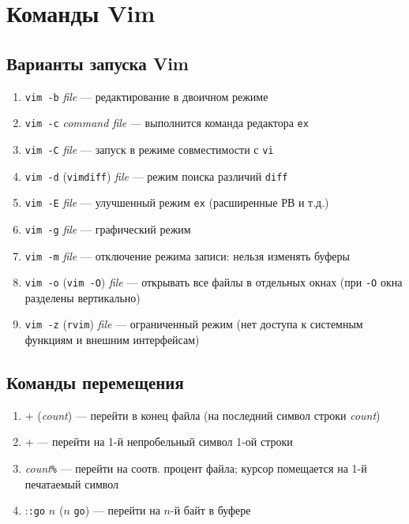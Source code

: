 \documentclass[a4paper,10pt, twocolumn]{article}
\newcommand*{\cod}[1]{\texttt{#1}}
\begin{document}
\newpage
\section{Команды Vim}
\subsection{Варианты запуска Vim}
\begin{enumerate}
    \item \cod{vim -b} \textit{file} --- редактирование в двоичном режиме
    \item \cod{vim -c}\textit{ command file} --- выполнится команда редактора \cod{ex}
    \item \cod{vim -C} \textit{file} --- запуск в режиме совместимости с \cod{vi}
    \item \cod{vim -d} (\cod{vimdiff}) \textit{file} --- режим поиска различий \cod{diff}
    \item \cod{vim -E} \textit{file} --- улучшенный режим \cod{ex} (расширенные РВ и т.д.)
    \item \cod{vim -g} \textit{file} --- графический режим
    \item \cod{vim -m} \textit{file} --- отключение режима записи: нельзя изменять буферы
    \item \cod{vim -o} (\cod{vim -O}) \textit{file} --- открывать все файлы в отдельных окнах (при \cod{-O} окна разделены вертикально)
    \item \cod{vim -z} (\cod{rvim}) \textit{file} --- ограниченный режим (нет доступа к системным функциям и внешним интерфейсам)
\end{enumerate}

\subsection{Команды перемещения}
\begin{enumerate}
    \item \Ctrl + \End (\textit{count}) --- перейти в конец файла (на последний символ строки \textit{count})
    \item \Ctrl + \Home --- перейти на 1-й непробельный символ 1-ой строки
    \item \textit{count}\cod{\%} --- перейти на соотв. процент файла; курсор помещается на 1-й печатаемый символ
    \item :\cod{:go} $n$ ($n$ \cod{go}) --- перейти на $n$-й байт в буфере 
\end{enumerate}
\end{document}
